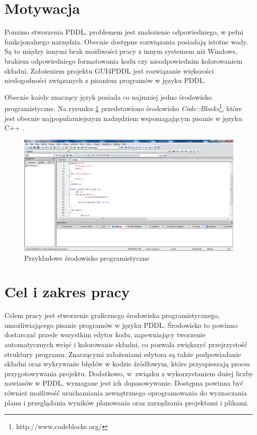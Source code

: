 \section{Motywacja}
Pomimo stworzenia PDDL, problemem jest znalezienie odpowiedniego, w pełni funkcjonalnego narzędzia. Obecnie dostępne rozwiązania posiadają istotne wady. Są to między innymi brak możliwości pracy z innym systemem  niż Windows, brakiem odpowiedniego formatowania kodu czy nieodpowiednim kolorowaniem składni. Założeniem projektu GUI4PDDL jest rozwiązanie większości niedogodności związanych z pisaniem programów w języku PDDL.

Obecnie każdy znaczący język posiada co najmniej jedno środowisko programistyczne. Na rysunku \ref{fig:srodowiskoprogramistyczne} przedstawiono środowisko \emph{Code::Blocks}\footnote{http://www.codeblocks.org/}, które jest obecnie najpopularniejszym nadzędziem wspomagającym pisanie w języku C++ .

\begin{figure}[h!]
    \centering
    
    \includegraphics[width=\textwidth]{img/codeblocks}
    \caption{Przykładowe środowisko programistyczne}
    \label{fig:srodowiskoprogramistyczne}
\end{figure}

\section{Cel i zakres pracy}
Celem pracy jest stworzenie graficznego środowiska programistycznego, umożliwiającego pisanie programów w języku PDDL. Środowisko to powinno dostarczać przede wszystkim edytor kodu, zapewniający tworzenie automatycznych wcięć i kolorowanie składni, co pozwala zwiększyć przejrzystość struktury programu. Znaczącymi założeniami edytora są także podpowiadanie składni oraz wykrywanie błędów w kodzie źródłowym, które przyspieszają proces przygotowywania projektu. Dodatkowo, w~związku z wykorzystaniem dużej liczby nawiasów w PDDL, wymagane jest ich dopasowywanie. Dostępna powinna być również możliwość uruchamiania zewnętrznego oprogramowania do wyznaczania planu i przeglądania wyników planowania oraz zarządzania projektami i plikami.  

